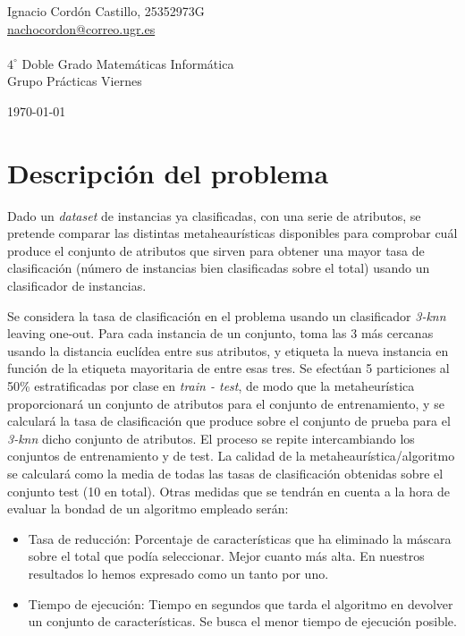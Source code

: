 \documentclass[a4paper,11pt]{article}
\newcommand{\imagent}[4]{
  \begin{wrapfigure}{#4}{0.7\textwidth}
    \begin{center}
    \texttt{[image: \#1]}
    \end{center}
    \caption{#3}
    \label{#4}
  \end{wrapfigure}
}
\newcommand{\imagen}[4]{
  \begin{minipage}{\linewidth}
    \centering
    \texttt{[image: \#1]}
    \captionof{figure}{#2}
    \label{#3}
  \end{minipage} 
}
\begin{document}
\begin{titlepage}
\begin{minipage}{\textwidth}
\begin{center} \large
Ignacio Cordón Castillo, 25352973G\\
\url{nachocordon@correo.ugr.es}\\
\ \\
$4^{\circ}$ Doble Grado Matemáticas Informática\\
Grupo Prácticas Viernes
\end{center}
\end{minipage}


\vspace{\fill}%
\large\today
\end{titlepage}  

\newpage
\tableofcontents
\newpage

\section{Descripción del problema}
Dado un \textit{dataset} de instancias ya clasificadas, con una serie de atributos, se pretende comparar las distintas 
metaheaurísticas disponibles para comprobar cuál produce el conjunto de atributos que sirven para obtener una mayor 
tasa de clasificación (número de instancias bien clasificadas sobre el total) usando un clasificador de instancias.

Se considera la tasa de clasificación en el problema usando un clasificador \textit{3-knn} leaving one-out. Para cada 
instancia de un conjunto, toma las 3 más cercanas usando la distancia euclídea entre sus atributos, y etiqueta la nueva
instancia en función de la etiqueta mayoritaria de entre esas tres. Se efectúan 5 particiones al 50\% estratificadas
por clase en \textit{train - test}, de modo que la metaheurística proporcionará un conjunto de atributos para el conjunto de
entrenamiento, y se calculará la tasa de clasificación que produce sobre el conjunto de prueba para el \textit{3-knn} dicho
conjunto de atributos. El proceso se repite intercambiando los conjuntos de entrenamiento y de test. La calidad de la 
metaheaurística/algoritmo se calculará como la media de todas las tasas de clasificación obtenidas sobre el conjunto test
(10 en total). Otras medidas que se tendrán en cuenta a la hora de evaluar la bondad de un algoritmo empleado serán:
\begin{itemize}
 \item Tasa de reducción: Porcentaje de características que ha eliminado la máscara sobre el total que podía 
 seleccionar. Mejor cuanto más alta. En nuestros resultados lo hemos expresado como un tanto por uno.
 \item Tiempo de ejecución: Tiempo en segundos que tarda el algoritmo en devolver un conjunto de características.
 Se busca el menor tiempo de ejecución posible.
\end{itemize}
\end{document}
